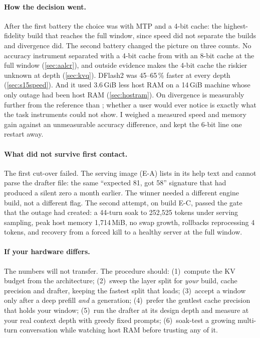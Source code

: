 \paragraph{How the decision went.} After the first battery the choice was \Qsix{} with MTP and a
4-bit cache: the highest-fidelity build that reaches the full window, since speed did not separate the
builds and divergence did. The second battery changed the picture on three counts. No accuracy
instrument separated \Qsix{} with a 4-bit cache from \Qfour{} with an 8-bit cache at the full window
(\cref{sec:aalcr}), and outside evidence makes the 4-bit cache the riskier unknown at depth
(\cref{sec:kvq}). DFlash2 was 45--65\,\% faster at every depth (\cref{sec:s15speed}). And it used 3.6\,GiB
less host RAM on a 14\,GiB machine whose only outage had been host RAM (\cref{sec:hostram}). On
divergence \Qfour{} is measurably further from the reference than \Qsix; whether a user would ever
notice is exactly what the task instruments could not show. I weighed a measured speed and memory gain
against an unmeasurable accuracy difference, and kept the 6-bit line one restart away.

\paragraph{What did not survive first contact.} The first cut-over failed. The serving image (E-A)
lists  in its help text and cannot parse the drafter file: the same ``expected 81,
got 58'' signature that had produced a silent zero a month earlier. The winner needed a different
engine build, not a different flag. The second attempt, on build E-C, passed the gate that the outage
had created: a 44-turn soak to 252{,}525 tokens under serving sampling, peak host memory 1{,}714\,MiB,
no swap growth, rollbacks reprocessing 4 tokens, and recovery from a forced kill to a healthy server
at the full window.

\paragraph{If your hardware differs.} The numbers will not transfer. The procedure should: (1)~compute
the KV budget from the architecture; (2)~sweep the layer split for \emph{your} build, cache precision
and drafter, keeping the fastest split that loads; (3)~accept a window only after a deep prefill
\emph{and} a generation; (4)~prefer the gentlest cache precision that holds your window; (5)~run the
drafter at its design depth and measure at your real context depth with greedy fixed prompts;
(6)~soak-test a growing multi-turn conversation while watching host RAM before trusting any of it.
